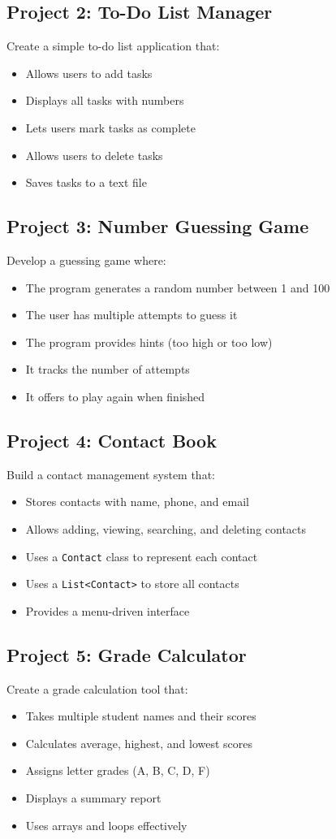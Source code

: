 \documentclass{article}
\begin{document}
\subsection{Project 2: To-Do List Manager}
Create a simple to-do list application that:
\begin{itemize}
    \item Allows users to add tasks
    \item Displays all tasks with numbers
    \item Lets users mark tasks as complete
    \item Allows users to delete tasks
    \item Saves tasks to a text file
\end{itemize}

\subsection{Project 3: Number Guessing Game}
Develop a guessing game where:
\begin{itemize}
    \item The program generates a random number between 1 and 100
    \item The user has multiple attempts to guess it
    \item The program provides hints (too high or too low)
    \item It tracks the number of attempts
    \item It offers to play again when finished
\end{itemize}

\subsection{Project 4: Contact Book}
Build a contact management system that:
\begin{itemize}
    \item Stores contacts with name, phone, and email
    \item Allows adding, viewing, searching, and deleting contacts
    \item Uses a \texttt{Contact} class to represent each contact
    \item Uses a \texttt{List<Contact>} to store all contacts
    \item Provides a menu-driven interface
\end{itemize}

\subsection{Project 5: Grade Calculator}
Create a grade calculation tool that:
\begin{itemize}
    \item Takes multiple student names and their scores
    \item Calculates average, highest, and lowest scores
    \item Assigns letter grades (A, B, C, D, F)
    \item Displays a summary report
    \item Uses arrays and loops effectively
\end{itemize}
\end{document}
